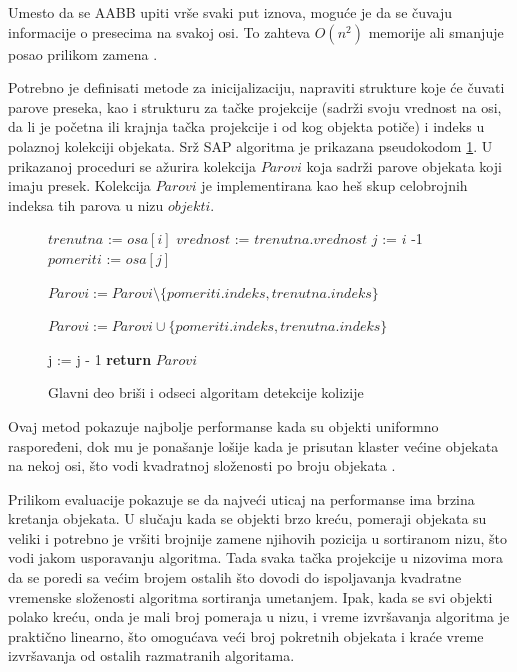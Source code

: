 \documentclass[12pt,oneside]{memoir}
\begin{document}
Umesto da se AABB upiti vrše svaki put iznova, moguće je da se čuvaju informacije o presecima 
na svakoj osi. To zahteva $O(n^2)$ memorije ali smanjuje posao prilikom zamena \cite{sap}. 

Potrebno je definisati metode za inicijalizaciju, napraviti strukture koje će čuvati parove preseka,
kao i strukturu za tačke projekcije (sadrži svoju vrednost na osi, da li je početna ili krajnja tačka projekcije i od kog objekta potiče)
i indeks u polaznoj kolekciji objekata.
Srž SAP algoritma je prikazana pseudokodom \ref{alg:SAP}. 
U prikazanoj proceduri se ažurira kolekcija $Parovi$ koja sadrži parove objekata koji imaju presek. 
Kolekcija $Parovi$ je implementirana kao heš skup celobrojnih indeksa tih parova u nizu $objekti$.

\begin{figure}[!h]
    \label{alg:SAP}
	\begin{algorithmic}[1]
			\State $trenutna$ :=  $osa[i]$
			\State $vrednost$ := $trenutna.vrednost$
			\State $j$ := $i$ -1
				\State $pomeriti$ := $osa[j]$


					\State $Parovi:=Parovi \setminus \{pomeriti.indeks, trenutna.indeks\}$
				\EndIf		

						\State $Parovi:=Parovi \cup \{pomeriti.indeks, trenutna.indeks\}$
					\EndIf		
				\EndIf

				\State j := j - 1
			\EndWhile
		\EndFor
		\State \textbf{return} $Parovi$
		\EndProcedure
	\end{algorithmic}
	\caption{Glavni deo briši i odseci algoritam detekcije kolizije}
\end{figure}

Ovaj metod pokazuje najbolje performanse kada su objekti uniformno raspoređeni, dok mu je ponašanje lošije kada je
prisutan klaster većine objekata na nekoj osi, što vodi kvadratnoj složenosti po broju objekata \cite{sap}.

Prilikom evaluacije pokazuje se da najveći uticaj na performanse ima brzina kretanja objekata.
U slučaju kada se objekti brzo kreću, pomeraji objekata su veliki i potrebno je vršiti brojnije zamene njihovih pozicija u sortiranom nizu,
što vodi jakom usporavanju algoritma.
Tada svaka tačka projekcije u nizovima mora 
da se poredi sa većim brojem ostalih što dovodi do ispoljavanja kvadratne vremenske složenosti algoritma sortiranja umetanjem.
Ipak, kada se svi objekti polako kreću, onda je mali broj pomeraja u nizu, i vreme izvršavanja algoritma je praktično 
linearno, što omogućava veći broj pokretnih objekata i kraće vreme izvršavanja od ostalih razmatranih algoritama.
\end{document}
